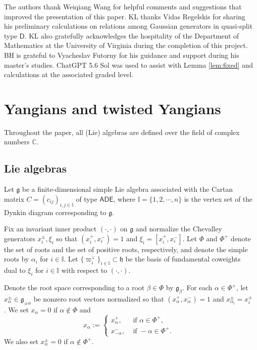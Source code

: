 \documentclass[11pt,reqno]{amsart}
\numberwithin{equation}{section}
\theoremstyle{definition}
\theoremstyle{remark}
\newcommand{\g}{\mathfrak{g}}
\newcommand{\h}{\mathfrak{h}}
\newcommand{\I}{{\mathbb I}}
\begin{document}
\medskip

The authors thank Weiqiang Wang for helpful comments and suggestions that improved the presentation of this paper. KL thanks Vidas Regelskis for sharing his preliminary calculations \cite{regelskis2026note} on relations among Gaussian generators in quasi-split type $\mathsf D$. KL also gratefully acknowledges the hospitality of the Department of Mathematics at the University of Virginia during the completion of this project. BH is grateful to Vyacheslav Futorny for his guidance and support during his master's studies. ChatGPT 5.6 Sol was used to assist with Lemma \ref{lem:fixed} and calculations at the associated graded level.


\medskip







\section{Yangians and twisted Yangians}\label{sec:pre}
Throughout the paper, all (Lie) algebras are defined over the field of complex numbers $\mathbb C$.

\subsection{Lie algebras}
Let $\g$ be a finite-dimensional simple Lie algebra associated with the Cartan matrix $C=(c_{ij})_{i,j\in\I}$ of type $\mathsf{ADE}$, where $\I=\{1,2,\cdots,n\}$ is the vertex set of the Dynkin diagram corresponding to $\g$. 

Fix an invariant inner product $(\cdot,\cdot)$ on $\g$ and normalize the Chevalley generators $x_i^\pm,\xi_i$ so that $(x_i^+,x_i^-)=1$ and $\xi_i=[x_i^+,x_i^-]$. Let $\Phi$ and $\Phi^+$ denote the set of roots and the set of positive roots, respectively, and denote the simple roots by $\alpha_i$ for $i\in \I$. Let $\{\varpi_i^\vee\}_{i\in \I}\subset\h $ be the basis of fundamental coweights dual to $\xi_i$ for $i\in \I$ with respect to $(\cdot,\cdot)$.

Denote the root space corresponding to a root $\beta\in\Phi$ by $\g_\beta$. For each $\alpha\in \Phi^+$, let $x^\pm_\alpha\in \g_{\pm\alpha}$ be nonzero root vectors normalized so that $(x_\alpha^+,x_\alpha^-)=1$ and $x_{\alpha_i}^\pm=x_i^\pm$. We set $x_{\alpha}=0$ if $\alpha\notin \Phi$ and
\[
x_\alpha:=\begin{cases}
x_\alpha^+, & \text{ if }\alpha\in\Phi^+,\\
x_{-\alpha}^-,& \text{ if }-\alpha\in\Phi^+.
\end{cases}
\]
We also set $x_{\alpha}^\pm=0$ if $\alpha\notin\Phi^+$.
\end{document}
